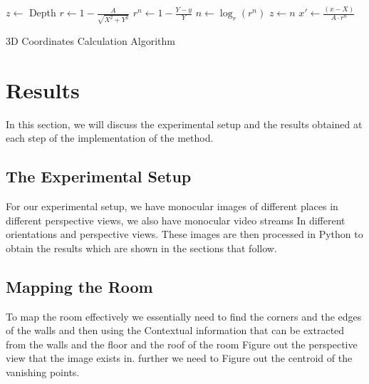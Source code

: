 \documentclass[12pt]{report}
\begin{document}
    \begin{algorithm}[H]
        \label{3D Coordinates Calculation Algorithm}
    \SetAlgoLined
    
    
    $z \leftarrow$ Depth\;
    $r \leftarrow 1 - \frac{A}{\sqrt{X^2+Y^2}}$\;
    $r^n \leftarrow 1 - \frac{Y-y}{Y}$\;
    $n \leftarrow \log_r(r^n)$ 
    $z \leftarrow n$\;
    $x' \leftarrow \frac{(x-X)}{A \cdot r^n}$\;
    
     
    \caption{3D Coordinates Calculation Algorithm}
    \end{algorithm}
    
    



\section{Results}

In this section, we will discuss the experimental setup and the results obtained at each step of the implementation of the method.\newline

\subsection{The Experimental Setup}

For our experimental setup, we have monocular images of different places in different perspective views, we also have monocular video streams In different orientations and perspective views. These images are then processed in Python to obtain the results which are shown in the sections that follow.\newline

\subsection{Mapping the Room}

To map the room effectively we essentially need to find the corners and the edges of the walls and then using the Contextual information that can be extracted from the walls and the floor and the roof of the room Figure out the perspective view that the image exists in. further we need to Figure out the centroid of the vanishing points.\newline
\end{document}
